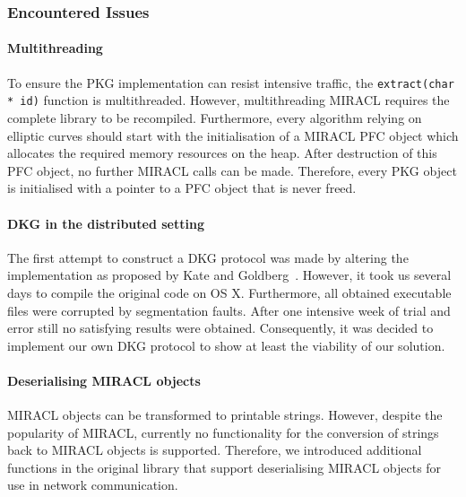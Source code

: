 \subsubsection{Encountered Issues}

\paragraph{Multithreading} To ensure the PKG implementation can resist intensive traffic, the \texttt{extract(char * id)} function is multithreaded. However, multithreading {MIRACL} requires the complete library to be recompiled. Furthermore, every algorithm relying on elliptic curves should start with the initialisation of a MIRACL PFC object which allocates the required memory resources on the heap. After destruction of this PFC object, no further MIRACL calls can be made. Therefore, every PKG object is initialised with a pointer to a PFC object that is never freed.

\paragraph{DKG in the distributed setting} The first attempt to construct a DKG protocol was made by altering the implementation as proposed by Kate and Goldberg~\cite{art:KateHG12}. However, it took us several days to compile the original code on OS X. Furthermore, all obtained executable files were corrupted by segmentation faults. After one intensive week of trial and error still no satisfying results were obtained. Consequently, it was decided to implement our own DKG protocol to show at least the viability of our solution.

\paragraph{Deserialising MIRACL objects} MIRACL objects can be transformed to printable strings. However, despite the popularity of MIRACL, currently no functionality for the conversion of strings back to MIRACL objects is supported. Therefore, we introduced additional functions in the original library that support deserialising MIRACL objects for use in network communication.

